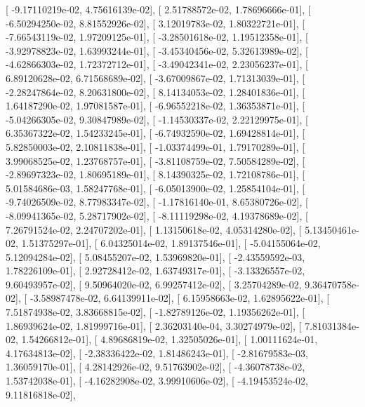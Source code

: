 \documentclass{article}
\begin{document}
       [ -9.17110219e-02,   4.75616139e-02],
       [  2.51788572e-02,   1.78696666e-01],
       [ -6.50294250e-02,   8.81552926e-02],
       [  3.12019783e-02,   1.80322721e-01],
       [ -7.66543119e-02,   1.97209125e-01],
       [ -3.28501618e-02,   1.19512358e-01],
       [ -3.92978823e-02,   1.63993244e-01],
       [ -3.45340456e-02,   5.32613989e-02],
       [ -4.62866303e-02,   1.72372712e-01],
       [ -3.49042341e-02,   2.23056237e-01],
       [  6.89120628e-02,   6.71568689e-02],
       [ -3.67009867e-02,   1.71313039e-01],
       [ -2.28247864e-02,   8.20631800e-02],
       [  8.14134053e-02,   1.28401836e-01],
       [  1.64187290e-02,   1.97081587e-01],
       [ -6.96552218e-02,   1.36353871e-01],
       [ -5.04266305e-02,   9.30847989e-02],
       [ -1.14530337e-02,   2.22129975e-01],
       [  6.35367322e-02,   1.54233245e-01],
       [ -6.74932590e-02,   1.69428814e-01],
       [  5.82850003e-02,   2.10811838e-01],
       [ -1.03374499e-01,   1.79170289e-01],
       [  3.99068525e-02,   1.23768757e-01],
       [ -3.81108759e-02,   7.50584289e-02],
       [ -2.89697323e-02,   1.80695189e-01],
       [  8.14390325e-02,   1.72108786e-01],
       [  5.01584686e-03,   1.58247768e-01],
       [ -6.05013900e-02,   1.25854104e-01],
       [ -9.74026509e-02,   8.77983347e-02],
       [ -1.17816140e-01,   8.65380726e-02],
       [ -8.09941365e-02,   5.28717902e-02],
       [ -8.11119298e-02,   4.19378689e-02],
       [  7.26791524e-02,   2.24707202e-01],
       [  1.13150618e-02,   4.05314280e-02],
       [  5.13450461e-02,   1.51375297e-01],
       [  6.04325014e-02,   1.89137546e-01],
       [ -5.04155064e-02,   5.12094284e-02],
       [  5.08455207e-02,   1.53969820e-01],
       [ -2.43559592e-03,   1.78226109e-01],
       [  2.92728412e-02,   1.63749317e-01],
       [ -3.13326557e-02,   9.60493957e-02],
       [  9.50964020e-02,   6.99257412e-02],
       [  3.25704289e-02,   9.36470758e-02],
       [ -3.58987478e-02,   6.64139911e-02],
       [  6.15958663e-02,   1.62895622e-01],
       [  7.51874938e-02,   3.83668815e-02],
       [ -1.82789126e-02,   1.19356262e-01],
       [  1.86939624e-02,   1.81999716e-01],
       [  2.36203140e-04,   3.30274979e-02],
       [  7.81031384e-02,   1.54266812e-01],
       [  4.89686819e-02,   1.32505026e-01],
       [  1.00111624e-01,   4.17634813e-02],
       [ -2.38336422e-02,   1.81486243e-01],
       [ -2.81679583e-03,   1.36059170e-01],
       [  4.28142926e-02,   9.51763902e-02],
       [ -4.36078738e-02,   1.53742038e-01],
       [ -4.16282908e-02,   3.99910606e-02],
       [ -4.19453524e-02,   9.11816818e-02],
\end{document}
